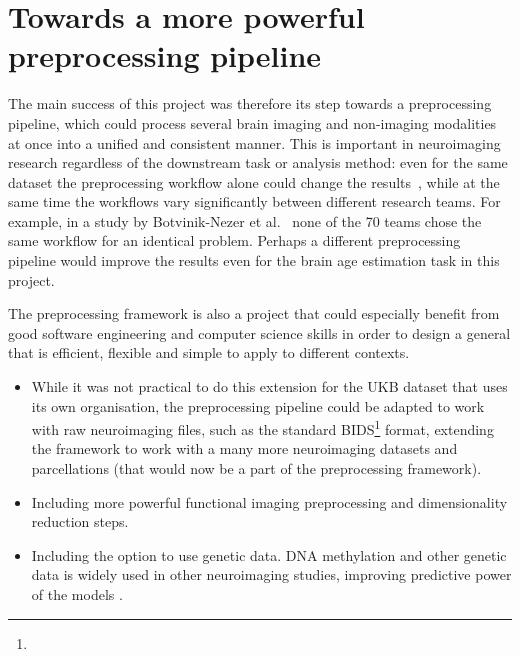 
\section{Towards a more powerful preprocessing pipeline}
The main success of this project was therefore its step towards a preprocessing pipeline, which could process several brain imaging and non-imaging modalities at once into a unified and consistent manner. This is important in neuroimaging research regardless of the downstream task or analysis method: even for the same dataset the preprocessing workflow alone could change the results~\cite{salehi2020there}, while at the same time the workflows vary significantly between different research teams. For example, in a study by Botvinik-Nezer et al.~\cite{botvinik2019variability} none of the 70 teams chose the same workflow for an identical problem. Perhaps a different preprocessing pipeline would improve the results even for the brain age estimation task in this project.

The preprocessing framework is also a project that could especially benefit from good software engineering and computer science skills in order to design a general that is efficient, flexible and simple to apply to different contexts.
\begin{itemize}
    \item While it was not practical to do this extension for the UKB dataset that uses its own organisation, the preprocessing pipeline could be adapted to work with raw neuroimaging files, such as the standard BIDS\footnote{} format, extending the framework to work with a many more neuroimaging datasets and parcellations (that would now be a part of the preprocessing framework).
    \item Including more powerful functional imaging preprocessing and dimensionality reduction steps.
    \item Including the option to use genetic data. DNA methylation and other genetic data is widely used in other neuroimaging studies, improving predictive power of the models \cite{cole2018brain,parisot2018disease}.
\end{itemize}

